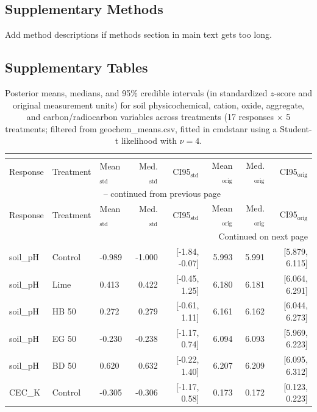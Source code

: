 \documentclass[preprint,12pt]{elsarticle}
\begin{document}
\subsection{Supplementary Methods}
\label{sec:si_methods}
Add method descriptions if methods section in main text gets too long.

\subsection{Supplementary Tables}
\label{sec:si_tables}

\begin{landscape}
\begin{longtable}{lllrrrrr}
\caption{Posterior means, medians, and 95\% credible intervals (in standardized $z$-score and original measurement units) for soil physicochemical, cation, oxide, aggregate, and carbon/radiocarbon variables across treatments (17 responses $\times$ 5 treatments; filtered from geochem_means.csv, fitted in cmdstanr using a Student-t likelihood with $\nu = 4$.}\\
\label{tab:geochem_means_sub}\\
\toprule
Response & Treatment & Mean$_{\text{std}}$ & Med.$_{\text{std}}$ & CI95$_{\text{std}}$ & Mean$_{\text{orig}}$ & Med.$_{\text{orig}}$ & CI95$_{\text{orig}}$ \\
\midrule
\endfirsthead
\multicolumn{8}{c}{{\tablename\ \thetable{} -- continued from previous page}} \\
\toprule
Response & Treatment & Mean$_{\text{std}}$ & Med.$_{\text{std}}$ & CI95$_{\text{std}}$ & Mean$_{\text{orig}}$ & Med.$_{\text{orig}}$ & CI95$_{\text{orig}}$ \\
\midrule
\endhead
\midrule \multicolumn{8}{r}{{Continued on next page}} \\ \endfoot
\bottomrule \endlastfoot
soil\_pH & Control & -0.989 & -1.000 & [-1.84, -0.07] & 5.993 & 5.991 & [5.879, 6.115] \\
soil\_pH & Lime & 0.413 & 0.422 & [-0.45, 1.25] & 6.180 & 6.181 & [6.064, 6.291] \\
soil\_pH & HB 50 & 0.272 & 0.279 & [-0.61, 1.11] & 6.161 & 6.162 & [6.044, 6.273] \\
soil\_pH & EG 50 & -0.230 & -0.238 & [-1.17, 0.74] & 6.094 & 6.093 & [5.969, 6.223] \\
soil\_pH & BD 50 & 0.620 & 0.632 & [-0.22, 1.40] & 6.207 & 6.209 & [6.095, 6.312] \\
CEC\_K & Control & -0.305 & -0.306 & [-1.17, 0.58] & 0.173 & 0.172 & [0.123, 0.223] \\

\end{longtable}
\end{landscape}
\end{document}
